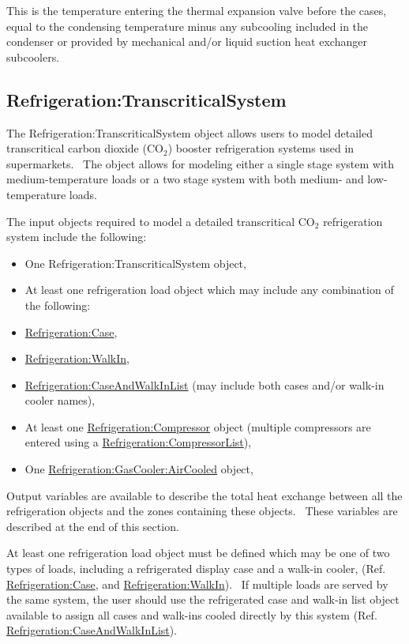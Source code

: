 This is the temperature entering the thermal expansion valve before the cases, equal to the condensing temperature minus any subcooling included in the condenser or provided by mechanical and/or liquid suction heat exchanger subcoolers.

\subsection{Refrigeration:TranscriticalSystem}\label{refrigerationtranscriticalsystem}

The Refrigeration:TranscriticalSystem object allows users to model detailed transcritical carbon dioxide (CO\(_{2}\)) booster refrigeration systems used in supermarkets.~ The object allows for modeling either a single stage system with medium-temperature loads or a two stage system with both medium- and low-temperature loads.

The input objects required to model a detailed transcritical CO\(_{2}\) refrigeration system include the following:

\begin{itemize}
\item
  One Refrigeration:TranscriticalSystem object,
\item
  At least one refrigeration load object which may include any combination of the following:
\item
  \hyperref[refrigerationcase]{Refrigeration:Case},
\item
  \hyperref[refrigerationwalkin]{Refrigeration:WalkIn},
\item
  \hyperref[refrigerationcaseandwalkinlist]{Refrigeration:CaseAndWalkInList} (may include both cases and/or walk-in cooler names),
\item
  At least one \hyperref[refrigerationcompressor]{Refrigeration:Compressor} object (multiple compressors are entered using a \hyperref[refrigerationcompressorlist]{Refrigeration:CompressorList}),
\item
  One \hyperref[refrigerationgascooleraircooled]{Refrigeration:GasCooler:AirCooled} object,
\end{itemize}

Output variables are available to describe the total heat exchange between all the refrigeration objects and the zones containing these objects.~ These variables are described at the end of this section.

At least one refrigeration load object must be defined which may be one of two types of loads, including a refrigerated display case and a walk-in cooler, (Ref. \hyperref[refrigerationcase]{Refrigeration:Case}, and \hyperref[refrigerationwalkin]{Refrigeration:WalkIn}).~ If multiple loads are served by the same system, the user should use the refrigerated case and walk-in list object available to assign all cases and walk-ins cooled directly by this system (Ref. \hyperref[refrigerationcaseandwalkinlist]{Refrigeration:CaseAndWalkInList}).

